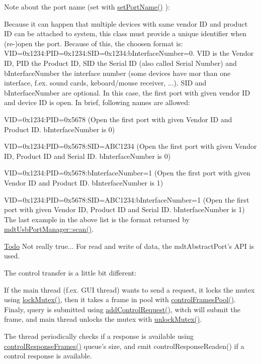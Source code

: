 Note about the port name (set with \hyperlink{classmdt_abstract_port_a0ca143d32fc677bac7c1cf0e04144932}{setPortName()} ):\par
 Because it can happen that multiple devices with same vendor ID and product ID can be attached to system, this class must provide a unique identifier when (re-\/)open the port. Because of this, the choosen format is: VID=0x1234:PID=0x1234:SID=0x1234:bInterfaceNumber=0. VID is the Vendor ID, PID the Product ID, SID the Serial ID (also called Serial Number) and bInterfaceNumber the interface number (some devices have mor than one interface, f.ex. sound cards, keboard/mouse receiver, ...). SID and bInterfaceNumber are optional. In this case, the first port with given vendor ID and device ID is open. In brief, following names are allowed:
\begin{DoxyItemize}
\item VID=0x1234:PID=0x5678 (Open the first port with given Vendor ID and Product ID. bInterfaceNumber is 0)
\item VID=0x1234:PID=0x5678:SID=ABC1234 (Open the first port with given Vendor ID, Product ID and Serial ID. bInterfaceNumber is 0)
\item VID=0x1234:PID=0x5678:bInterfaceNumber=1 (Open the first port with given Vendor ID and Product ID. bInterfaceNumber is 1)
\item VID=0x1234:PID=0x5678:SID=ABC1234:bInterfaceNumber=1 (Open the first port with given Vendor ID, Product ID and Serial ID. bInterfaceNumber is 1) The last example in the above list is the format returned by \hyperlink{classmdt_usb_port_manager_a3a2370c3a2d0353a880bf9b777728c3b}{mdtUsbPortManager::scan()}.
\end{DoxyItemize}

\begin{Desc}
\item[\hyperlink{todo__todo000049}{Todo}]Not really true... For read and write of data, the mdtAbstractPort's API is used.\end{Desc}


The control transfer is a little bit different:
\begin{DoxyItemize}
\item If the main thread (f.ex. GUI thread) wants to send a request, it locks the mutex using \hyperlink{classmdt_abstract_port_a6bf2ecdcf894da3929a22eb8793a9fe3}{lockMutex()}, then it takes a frame in pool with \hyperlink{classmdt_usb_port_af146b08006ddbe18fb537ae1a75b622e}{controlFramesPool()}. Finaly, query is submitted using \hyperlink{classmdt_usb_port_a4fbcd0fcc179335c55c6d7ccc40a7c31}{addControlRequest()}, witch will submit the frame, and main thread unlocks the mutex with \hyperlink{classmdt_abstract_port_a3523c72a06e4d950338f91e56c286e84}{unlockMutex()}.
\item The thread periodically checks if a response is available using \hyperlink{classmdt_usb_port_a304825c7d9173a3dcb5e26a412f1038b}{controlResponseFrames()} queue's size, and emit controlResponseReaden() if a control response is available.
\end{DoxyItemize}

